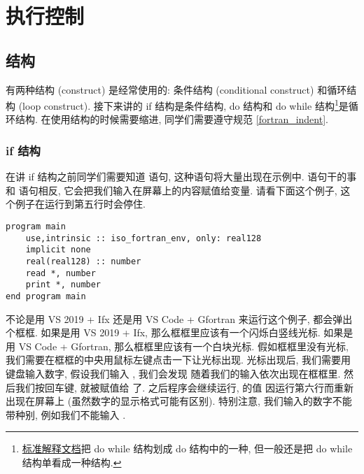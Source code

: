 \chapter{执行控制}

\section{结构}

有两种结构 (construct) 是经常使用的: 条件结构 (conditional construct) 和循环结构 (loop construct). 接下来讲的 if 结构是条件结构, do 结构和 do while 结构\footnote{\href{https://j3-fortran.org/doc/year/24/24-007.pdf}{标准解释文档}把 do while 结构划成 do 结构中的一种, 但一般还是把 do while 结构单看成一种结构.}是循环结构. 在使用结构的时候需要缩进, 同学们需要遵守规范 \ref{fortran_indent}.

\subsection{if 结构}\label{if_construct}

在讲 if 结构之前同学们需要知道  语句, 这种语句将大量出现在示例中.  语句干的事和  语句相反, 它会把我们输入在屏幕上的内容赋值给变量. 请看下面这个例子, 这个例子在运行到第五行时会停住.
\begin{lstlisting}
program main
    use,intrinsic :: iso_fortran_env, only: real128
    implicit none
    real(real128) :: number
    read *, number
    print *, number
end program main
\end{lstlisting}
不论是用 VS 2019 + Ifx 还是用 VS Code + Gfortran 来运行这个例子, 都会弹出个框框. 如果是用 VS 2019 + Ifx, 那么框框里应该有一个闪烁白竖线光标. 如果是用 VS Code + Gfortran, 那么框框里应该有一个白块光标. 假如框框里没有光标, 我们需要在框框的中央用鼠标左键点击一下让光标出现. 光标出现后, 我们需要用键盘输入数字, 假设我们输入 , 我们会发现  随着我们的输入依次出现在框框里. 然后我们按回车键,  就被赋值给  了. 之后程序会继续运行,  的值  因运行第六行而重新出现在屏幕上 (虽然数字的显示格式可能有区别). 特别注意, 我们输入的数字不能带种别, 例如我们不能输入 .

